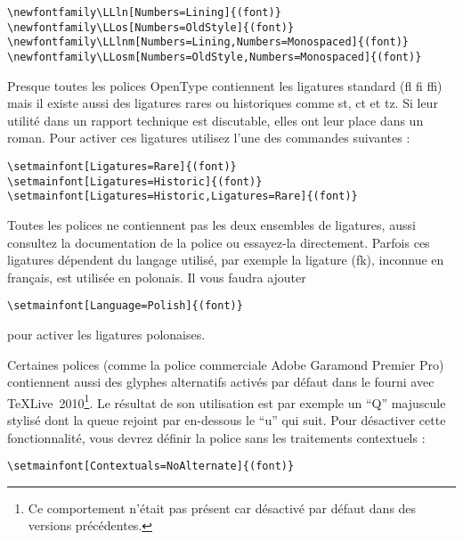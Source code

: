 \begin{code}
\begin{verbatim}
\newfontfamily\LLln[Numbers=Lining]{(font)}
\newfontfamily\LLos[Numbers=OldStyle]{(font)}
\newfontfamily\LLlnm[Numbers=Lining,Numbers=Monospaced]{(font)}
\newfontfamily\LLosm[Numbers=OldStyle,Numbers=Monospaced]{(font)}
\end{verbatim}
\end{code}

Presque toutes les polices OpenType contiennent les ligatures standard
(fl fi ffi) mais il existe aussi des ligatures rares ou historiques
comme st, ct et tz. Si leur utilité dans un rapport technique est
discutable, elles ont leur place dans un roman. Pour activer ces
ligatures utilisez l'une des commandes suivantes :

\begin{code}
\begin{verbatim}
\setmainfont[Ligatures=Rare]{(font)}
\setmainfont[Ligatures=Historic]{(font)}
\setmainfont[Ligatures=Historic,Ligatures=Rare]{(font)}
\end{verbatim}
\end{code}

Toutes les polices ne contiennent pas les deux ensembles de ligatures,
aussi consultez la documentation de la police ou essayez-la
directement. Parfois ces ligatures dépendent du langage utilisé, par
exemple la ligature (fk), inconnue en français, est utilisée en
polonais. Il vous faudra ajouter
\begin{code}
\begin{verbatim}
\setmainfont[Language=Polish]{(font)}
\end{verbatim}
\end{code}
pour activer les ligatures polonaises.

Certaines polices (comme la police commerciale Adobe Garamond Premier
Pro) contiennent aussi des glyphes alternatifs activés par défaut dans
le  fourni avec \TeX Live~2010\footnote{Ce
  comportement n'était pas présent car désactivé par défaut dans des
  versions précédentes.}. Le résultat de son utilisation est par
exemple un \enquote{Q} majuscule stylisé dont la queue rejoint par
en-dessous le \enquote{u} qui suit. Pour désactiver cette fonctionnalité,
vous devrez définir la police sans les traitements contextuels :

\begin{code}
\begin{verbatim}
\setmainfont[Contextuals=NoAlternate]{(font)}
\end{verbatim}
\end{code}

